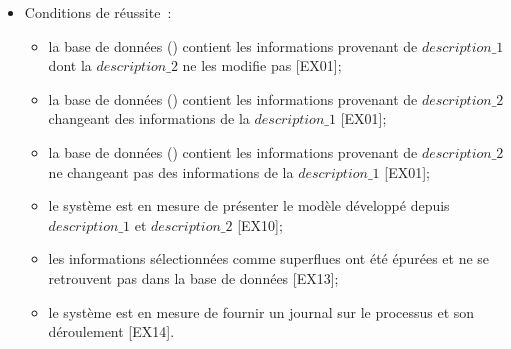 {\begin{itemize}
    \item Conditions de réussite~:
    \begin{itemize}
        \item la base de données () contient les informations provenant de $description\_1$ dont la $description\_2$ ne les modifie pas [EX01];
        \item la base de données () contient les informations provenant de $description\_2$ changeant des informations de la $description\_1$ [EX01];
        \item la base de données () contient les informations provenant de $description\_2$ ne changeant pas des informations de la $description\_1$ [EX01];
        \item le système est en mesure de présenter le modèle développé depuis $description\_1$ et $description\_2$ [EX10];
        \item les informations sélectionnées comme superflues ont été épurées et ne se retrouvent pas dans la base de données [EX13];
        \item le système est en mesure de fournir un journal sur le processus et son déroulement [EX14].
    \end{itemize}
\end{itemize}
\leavevmode\vspace{-\baselineskip}
}{}{}

